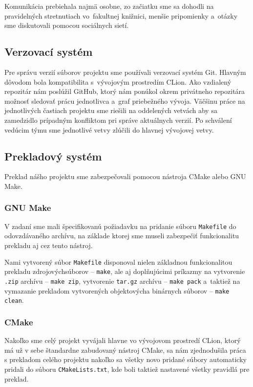\documentclass[a4paper, 11pt]{article}
\begin{document}
Komunikácia prebiehala najmä osobne, zo začiatku sme sa dohodli na pravidelných stretnutiach vo~fakultnej knižnici, menšie pripomienky a~otázky sme diskutovali pomocou sociálnych sietí.

\subsection{Verzovací systém}

Pre správu verzií súborov projektu sme používali verzovací systém Git. Hlavným dôvodom bola kompatibilita s~vývojovým prostredím CLion. Ako vzdialený repozitár nám poslúžil GitHub, ktorý nám ponúkol okrem privátneho repozitára možnosť sledovať prácu jednotlivca a~graf priebežného vývoja. Väčšinu práce na jednotlivých častiach projektu sme riešili na oddelených vetvách aby sa zamedzidlo prípadným konfliktom pri správe aktuálnych verzií. Po schválení vedúcim týmu sme jednotlivé vetvy zlúčili do hlavnej vývojovej vetvy.

\subsection{Prekladový systém}
Preklad nášho projektu sme zabezpečovali pomocou nástroja CMake alebo GNU Make.

\subsubsection{GNU Make}
V zadaní sme mali špecifikovanú požiadavku na pridanie súboru \texttt{Makefile} do odovzdávaného archívu, na základe ktorej sme museli zabezpečiť funkcionalitu prekladu aj cez tento nástroj.

Nami vytvorený súbor \texttt{Makefile} disponoval nielen základnou funkcionalitou prekladu zdrojových\linebreak súborov -- \texttt{make}, ale aj doplňujúcimi príkazmy na vytvorenie \texttt{.zip} archívu -- \texttt{make\,zip},\linebreak
vytvorenie \texttt{tar.gz} archívu -- \texttt{make\,pack} a~taktiež na vymazanie prekladom vytvorených objektových\linebreak a binárnych súborov -- \texttt{make\,clean}.

\subsubsection{CMake}

Nakoľko sme celý projekt vyvájali hlavne vo vývojovom prostredí CLion, ktorý má už v sebe štandardne zabudovaný nástroj CMake, sa nám zjednodušila práca s prekladom celého projektu nakoľko sa všetky novo pridané súbory automaticky pridali do súboru \texttt{CMakeLists.txt}, kde boli taktiež nastavené všetky pravidlá pre preklad.
\end{document}
